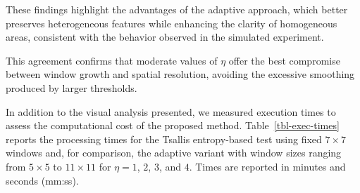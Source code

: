 \documentclass[
  lettersize  journal,
]{IEEEtran}%
\providecommand{\DIFaddtex}[1]{{\protect\color{blue}\uwave{#1}}} %
\providecommand{\DIFaddFL}[1]{\DIFadd{#1}} %
\providecommand{\DIFaddbeginFL}{} %
\providecommand{\DIFaddendFL}{} %
\providecommand{\DIFadd}[1]{\texorpdfstring{\DIFaddtex{#1}}{#1}} %
\providecommand{\DIFaddincludegraphics}[2][]{{\color{blue}\fbox{\DIFOincludegraphics[#1]{#2}}}} %
\DeclareRobustCommand{\DIFaddbeginFL}{\DIFOaddbeginFL \let\includegraphics\DIFaddincludegraphics} %
\DeclareRobustCommand{\DIFaddendFL}{\DIFOaddendFL \let\includegraphics\DIFOincludegraphics} %
\begin{document}
These findings highlight the advantages of the adaptive approach, which
better preserves heterogeneous features while enhancing the clarity of
homogeneous areas, consistent with the behavior observed in the
simulated experiment.

This agreement confirms that moderate values of \(\eta\) offer the best
compromise between window growth and spatial resolution, avoiding the
excessive smoothing produced by larger thresholds.

In addition to the visual analysis presented, we measured execution
times to assess the computational cost of the proposed method.
Table~\ref{tbl-exec-times} reports the processing times for the Tsallis
entropy-based test using fixed \(7\times7\) windows and, for comparison,
the adaptive variant with window sizes ranging from \(5\times5\) to
\(11\times11\) for \(\eta=1\), \(2\), \(3\), and \(4\). Times are
reported in minutes and seconds (mm:ss).

\renewcommand{\arraystretch}{1.4}

\begin{table}[hbt]

\caption{\label{tbl-exec-times}Execution times for heterogeneity
detection using fixed and adaptive windows \DIFaddbeginFL \DIFaddFL{in minutes and seconds}\DIFaddendFL .}


\end{table}%
\end{document}
